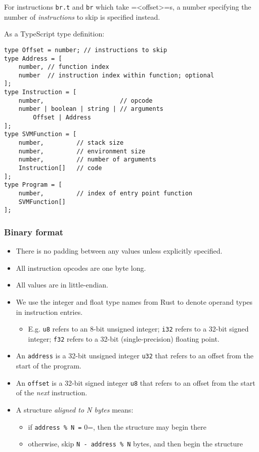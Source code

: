 \documentclass[11pt]{article}
\begin{document}
For instructions \texttt{br.t} and \texttt{br} which take =<offset>=s, a number
specifying the number of \emph{instructions} to skip is specified instead.

As a TypeScript type definition:

\begin{verbatim}
type Offset = number; // instructions to skip
type Address = [
    number, // function index
    number  // instruction index within function; optional
];
type Instruction = [
    number,                     // opcode
    number | boolean | string | // arguments
        Offset | Address
];
type SVMFunction = [
    number,         // stack size
    number,         // environment size
    number,         // number of arguments
    Instruction[]   // code
];
type Program = [
    number,         // index of entry point function
    SVMFunction[]
];
\end{verbatim}

\subsubsection{Binary format}
\label{sec:orgcab67ee}
\begin{itemize}
\item There is no padding between any values unless explicitly specified.
\item All instruction opcodes are one byte long.
\item All values are in little-endian.
\item We use the integer and float type names from Rust to denote operand
types in instruction entries.

\begin{itemize}
\item E.g. \texttt{u8} refers to an 8-bit unsigned integer; \texttt{i32} refers to a
32-bit signed integer; \texttt{f32} refers to a 32-bit (single-precision)
floating point.
\end{itemize}

\item An \texttt{address} is a 32-bit unsigned integer \texttt{u32} that refers to an
offset from the start of the program.
\item An \texttt{offset} is a 32-bit signed integer \texttt{u8} that refers to an offset
from the start of the \emph{next} instruction.
\item A structure \emph{aligned to N bytes} means:

\begin{itemize}
\item if \texttt{address \% N =} 0=, then the structure may begin there
\item otherwise, skip \texttt{N - address \% N} bytes, and then begin the
structure
\end{itemize}
\end{itemize}
\end{document}
